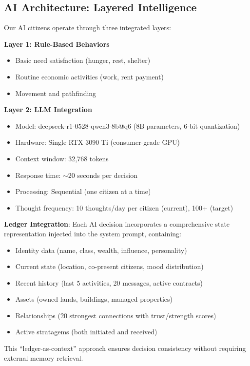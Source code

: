 \documentclass[11pt,a4paper]{article}
\begin{document}
\subsection{AI Architecture: Layered Intelligence}

Our AI citizens operate through three integrated layers:

\textbf{Layer 1: Rule-Based Behaviors}
\begin{itemize}
\item Basic need satisfaction (hunger, rest, shelter)
\item Routine economic activities (work, rent payment)
\item Movement and pathfinding
\end{itemize}

\textbf{Layer 2: LLM Integration}
\begin{itemize}
\item Model: deepseek-r1-0528-qwen3-8b@q6 (8B parameters, 6-bit quantization)
\item Hardware: Single RTX 3090 Ti (consumer-grade GPU)
\item Context window: 32,768 tokens
\item Response time: $\sim$20 seconds per decision
\item Processing: Sequential (one citizen at a time)
\item Thought frequency: 10 thoughts/day per citizen (current), 100+ (target)
\end{itemize}

\textbf{Ledger Integration}: Each AI decision incorporates a comprehensive state representation injected into the system prompt, containing:
\begin{itemize}
\item Identity data (name, class, wealth, influence, personality)
\item Current state (location, co-present citizens, mood distribution)
\item Recent history (last 5 activities, 20 messages, active contracts)
\item Assets (owned lands, buildings, managed properties)
\item Relationships (20 strongest connections with trust/strength scores)
\item Active stratagems (both initiated and received)
\end{itemize}

This ``ledger-as-context'' approach ensures decision consistency without requiring external memory retrieval.
\end{document}
